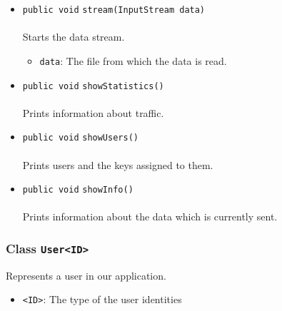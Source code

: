 \begin{itemize}
\item \lstinline|public void| \lstinline|stream|\lstinline|(InputStream data)|\\ \\[-0.6em]
Starts the data stream.
\begin{itemize}
\item \lstinline|data|: The file from which the data is read.
\end{itemize}



\item \lstinline|public void| \lstinline|showStatistics|\lstinline|()|\\ \\[-0.6em]
Prints information about traffic.



\item \lstinline|public void| \lstinline|showUsers|\lstinline|()|\\ \\[-0.6em]
Prints users and the keys assigned to them.



\item \lstinline|public void| \lstinline|showInfo|\lstinline|()|\\ \\[-0.6em]
Prints information about the data which is currently sent.



\end{itemize}

\subsubsection{Class \lstinline|User<ID>|}
Represents a user in our application. \\
\noindent\begin{minipage}[t]{5cm}
\vspace{0.3em}
\hspace*{2em}
\vspace{0.3em}
\end{minipage}

\begin{itemize}
\item \lstinline|<ID>|: The type of the user identities
\end{itemize}




